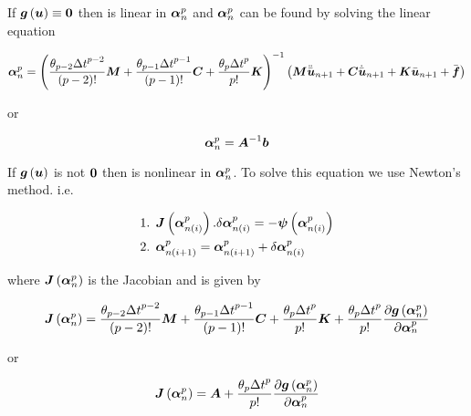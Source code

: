 If $\fnof{\vect{g}}{\vect{u}}\equiv\vect{0}$ then  is linear in
$\vect{\alpha}^{p}_{n}$ and $\vect{\alpha}^{p}_{n}$ can be found by solving
the linear equation

\begin{equation}
  \vect{\alpha}^{p}_{n} =\inverse{\pbrac{\dfrac{\theta_{p-2}{\Delta t}^{p-2}}{\factorial{p-2}}\matr{M}+
      \dfrac{\theta_{p-1}{\Delta t}^{p-1}}{\factorial{p-1}}\matr{C}+
      \dfrac{\theta_{p}{\Delta
          t}^{p}}{p!}\matr{K}}}\pbrac{\matr{M}\ddot{\bar{\vect{u}}}_{n+1}+
    \matr{C}\dot{\bar{\vect{u}}}_{n+1}+\matr{K}\bar{\vect{u}}_{n+1}+\bar{\vect{f}}}
\end{equation}

or 

\begin{equation}
  \vect{\alpha}^{p}_{n} =\inverse{\matr{A}}\vect{b}
\end{equation}

If $\fnof{\vect{g}}{\vect{u}}$ is not $\vect{0}$ then  is nonlinear in $\vect{\alpha}^{p}_{n}$. To solve this
equation we use Newton's method. i.e.

\begin{equation}
  \begin{split}
    \text{1.  } & \fnof{\matr{J}}{\vect{\alpha}^{p}_{n(i)}}.\delta
    \vect{\alpha}^{p}_{n(i)} = 
    -\fnof{\vect{\psi}}{\vect{\alpha}^{p}_{n(i)}} \\
    \text{2.  } & \vect{\alpha}^{p}_{n(i+1)}=\vect{\alpha}^{p}_{n(i+1)}+\delta
    \vect{\alpha}^{p}_{n(i)}
  \end{split}
\end{equation}

where $\fnof{\matr{J}}{\vect{\alpha}^{p}_{n}}$ is the Jacobian and is given by

\begin{equation}
  \fnof{\matr{J}}{\vect{\alpha}^{p}_{n}}=\dfrac{\theta_{p-2}{\Delta t}^{p-2}}{\factorial{p-2}}\matr{M}+\dfrac{\theta_{p-1}{\Delta
      t}^{p-1}}{\factorial{p-1}}\matr{C}+\dfrac{\theta_{p}{\Delta
      t}^{p}}{p!}\matr{K}+\dfrac{\theta_{p}{\Delta t}^{p}}{p!}
  \delby{\fnof{\vect{g}}{\vect{\alpha}^{p}_{n}}}{\vect{\alpha}^{p}_{n}}
\end{equation}

or

\begin{equation}
  \fnof{\matr{J}}{\vect{\alpha}^{p}_{n}}=\matr{A}+\dfrac{\theta_{p}{\Delta t}^{p}}{p!}\delby{\fnof{\vect{g}}{\vect{\alpha}^{p}_{n}}}{\vect{\alpha}^{p}_{n}}
\end{equation}

